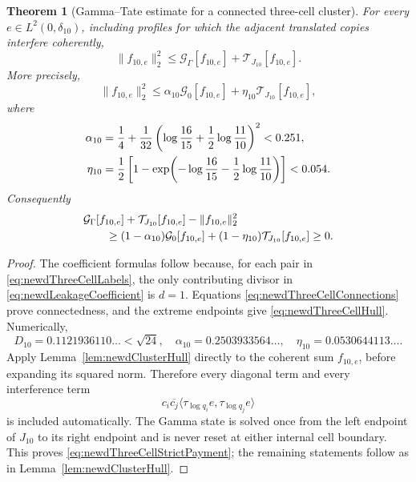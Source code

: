 \documentclass[11pt]{amsart}
\newtheorem{theorem}{Theorem}[section]
\theoremstyle{definition}
\theoremstyle{remark}
\begin{document}
\begin{theorem}[Gamma--Tate estimate for a connected three-cell cluster]
\label{thm:newdThreeCellCluster}
For every $e\in L^2(0,\delta_{10})$, including profiles for which the
adjacent translated copies interfere coherently,
\begin{equation}\label{eq:newdThreeCellPayment}
 \|f_{10,e}\|_2^2
 \leq\mathcal G_\Gamma[f_{10,e}]
      +\mathcal T_{J_{10}}[f_{10,e}].
\end{equation}
More precisely,
\begin{equation}\label{eq:newdThreeCellStrictPayment}
 \|f_{10,e}\|_2^2
 \leq\alpha_{10}\mathcal G_0[f_{10,e}]
      +\eta_{10}\mathcal T_{J_{10}}[f_{10,e}],
\end{equation}
where
\begin{align}
 \alpha_{10}
 &=\frac14+\frac1{32}
   \left(\log\frac{16}{15}
        +\frac12\log\frac{11}{10}\right)^2
   <0.251,\notag\\
 \eta_{10}
 &=\frac12\left[1-
   \exp\!\left(-\log\frac{16}{15}
               -\frac12\log\frac{11}{10}\right)\right]
   <0.054.
 \label{eq:newdThreeCellConstants}
\end{align}
Consequently
\begin{align}
 &\mathcal G_\Gamma[f_{10,e}]
  +\mathcal T_{J_{10}}[f_{10,e}]-\|f_{10,e}\|_2^2
 \notag\\
 &\qquad\geq
 (1-\alpha_{10})\mathcal G_0[f_{10,e}]
 +(1-\eta_{10})\mathcal T_{J_{10}}[f_{10,e}]\geq0.
 \label{eq:newdThreeCellRemainder}
\end{align}
\end{theorem}

\begin{proof}
The coefficient formulas follow because, for each pair in
\eqref{eq:newdThreeCellLabels}, the only contributing divisor in
\eqref{eq:newdLeakageCoefficient} is $d=1$.  Equations
\eqref{eq:newdThreeCellConnections} prove connectedness, and the extreme
endpoints give \eqref{eq:newdThreeCellHull}.  Numerically,
\[
 D_{10}=0.1121936110\ldots<\sqrt{24},
 \quad
 \alpha_{10}=0.2503933564\ldots,
 \quad
 \eta_{10}=0.0530644113\ldots.
\]
Apply Lemma~\ref{lem:newdClusterHull} directly to the coherent sum
$f_{10,e}$, before expanding its squared norm.  Therefore every diagonal
term and every interference term
\[
 c_i\overline{c_j}
 \langle\tau_{\log q_i}e,\tau_{\log q_j}e\rangle
\]
is included automatically.  The Gamma state is solved once from the left
endpoint of $J_{10}$ to its right endpoint and is never reset at either
internal cell boundary.  This proves
\eqref{eq:newdThreeCellStrictPayment}; the remaining statements follow as
in Lemma~\ref{lem:newdClusterHull}.
\end{proof}
\end{document}
